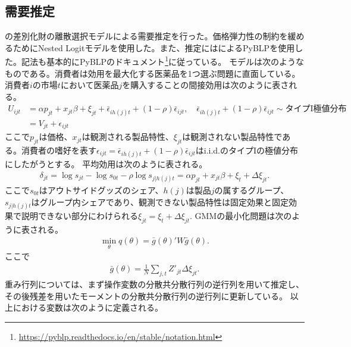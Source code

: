 \documentclass[a4paper,11pt,uplatex]{jsarticle}
\theoremstyle{definition}
\begin{document}
\subsection{需要推定}
\cite{Berry1994}の差別化財の離散選択モデルによる需要推定を行った。価格弾力性の制約を緩めるためにNested Logitモデルを使用した。また、推定には\cite{ConlonGortmaker}によるPyBLPを使用した。記法も基本的にPyBLPのドキュメント\footnote{\url{https://pyblp.readthedocs.io/en/stable/notation.html}}に従っている。
モデルは次のようなものである。消費者は効用を最大化する医薬品を1つ選ぶ問題に直面している。
消費者\(i\)の市場\(t\)において医薬品\(j\)を購入することの間接効用は次のように表される。
\begin{align*}
U_{ijt}&=\alpha p_{jt} + x_{jt} \beta + \xi_{jt} + \bar\epsilon_{ih(j)t}+(1-\rho)\bar \epsilon_{ijt}, \quad \bar\epsilon_{ih(j)t}+(1-\rho) \bar \epsilon_{ijt} \sim \textrm{タイプI極値分布}\\
&=V_{jt}+\epsilon_{ijt}
\end{align*}
ここで\(p_{jt}\)は価格、\(x_{jt}\)は観測される製品特性、\(\xi_{jt}\)は観測されない製品特性である。消費者の嗜好を表す\(\epsilon_{ijt}=\bar\epsilon_{ih(j)t}+(1-\rho)\bar \epsilon_{ijt}\)はi.i.d.のタイプIの極値分布にしたがうとする。
平均効用は次のように表される。
\begin{align*}
\delta_{jt}=\log s_{jt}-\log s_{0t}-\rho \log s_{j | h(j)t}=\alpha p_{jt} + x_{jt} \beta +\xi_t+\Delta \xi_{jt}.
\end{align*}
ここで\(s_{0t}\)はアウトサイドグッズのシェア、\(h(j)\)は製品\(j\)の属するグループ、\(s_{j | h(j)t}\)はグループ内シェアであり、観測できない製品特性は固定効果と固定効果で説明できない部分にわけられる\(\xi_{jt}=\xi_t+\Delta \xi_{jt}\).
GMMの最小化問題は次のように表される。
\begin{align*}
\min_\theta q(\theta)=\bar g(\theta)'W \bar g(\theta).
\end{align*}
ここで
\begin{align*}
\bar g(\theta)=\frac{1}{N} \sum _{j,t} Z'_{jt} \Delta\xi_{jt}.
\end{align*}
重み行列については、まず操作変数の分散共分散行列の逆行列を用いて推定し、その後残差を用いたモーメントの分散共分散行列の逆行列に更新している。
以上における変数は次のように定義される。
\end{document}
